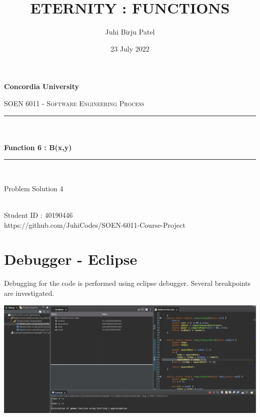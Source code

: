 \documentclass[12pt]{report}
\title{ETERNITY : FUNCTIONS}
\author{Juhi Birju Patel}
\date{23 July 2022}
\makeatletter
\let\thetitle\@title
\let\theauthor\@author
\makeatother
\begin{document}
\begin{titlepage}
	\centering
    \vspace*{0.5 cm}
\begin{center}    \textbf{\Large Concordia University}\\[2.0 cm]	\end{center}
	\textsc{\Large  SOEN 6011 - Software Engineering Process }\\[0.5 cm]
	\rule{\linewidth}{0.2 mm} \\[0.4 cm]
	{ \huge \textbf \thetitle}\\[0.2 cm]
	{ \huge \textbf{ Function 6 : B(x,y)}}
	\rule{\linewidth}{0.2 mm} \\[1.5 cm]

\begin{center}   {\Large Problem Solution 4}\\[2.0 cm]
\end{center}	
\begin{center}   {\Large \textbf{\theauthor}} \\[0.2 cm]
                 {\large Student ID : 40190446 }\\[0.2 cm]
                 {\large https://github.com/JuhiCodes/SOEN-6011-Course-Project}
\end{center}
	
\end{titlepage}

\tableofcontents
\pagebreak
\renewcommand{\thesection}{\arabic{section}}
\newpage
\section{Debugger - Eclipse}
Debugging for the code is performed using eclipse debugger. Several breakpoints are investigated.
\begin{center}
   \includegraphics[scale=0.25]{images/eclipse_debugger.png}
\end{center}
    
\end{document}
